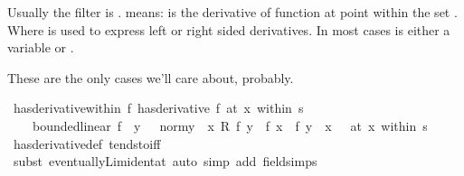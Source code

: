 \begin{isabellebody}
\begin{isamarkuptext}%
Usually the filter  is .   means:  is the derivative of function  at point 
  within the set . Where  is used to express left or right sided derivatives. In
  most cases  is either a variable or .%
\end{isamarkuptext}\isamarkuptrue%
%
\begin{isamarkuptext}%
These are the only cases we'll care about, probably.%
\end{isamarkuptext}\isamarkuptrue%
\isamarkupfalse%
\ has{\isacharunderscore}{\kern0pt}derivative{\isacharunderscore}{\kern0pt}within{\isacharcolon}{\kern0pt}\ {\isachardoublequoteopen}{\isacharparenleft}{\kern0pt}f\ has{\isacharunderscore}{\kern0pt}derivative\ f{\isacharprime}{\kern0pt}{\isacharparenright}{\kern0pt}\ {\isacharparenleft}{\kern0pt}at\ x\ within\ s{\isacharparenright}{\kern0pt}\ {\isasymlongleftrightarrow}\isanewline
\ \ \ \ bounded{\isacharunderscore}{\kern0pt}linear\ f{\isacharprime}{\kern0pt}\ {\isasymand}\ {\isacharparenleft}{\kern0pt}{\isacharparenleft}{\kern0pt}{\isasymlambda}y{\isachardot}{\kern0pt}\ {\isacharparenleft}{\kern0pt}{}\ {\isacharslash}{\kern0pt}\ norm{\isacharparenleft}{\kern0pt}y\ {\isacharminus}{\kern0pt}\ x{\isacharparenright}{\kern0pt}{\isacharparenright}{\kern0pt}\ {\isacharasterisk}{\kern0pt}\isactrlsub R\ {\isacharparenleft}{\kern0pt}f\ y\ {\isacharminus}{\kern0pt}\ {\isacharparenleft}{\kern0pt}f\ x\ {\isacharplus}{\kern0pt}\ f{\isacharprime}{\kern0pt}\ {\isacharparenleft}{\kern0pt}y\ {\isacharminus}{\kern0pt}\ x{\isacharparenright}{\kern0pt}{\isacharparenright}{\kern0pt}{\isacharparenright}{\kern0pt}{\isacharparenright}{\kern0pt}\ {\isasymlonglongrightarrow}\ {}{\isacharparenright}{\kern0pt}\ {\isacharparenleft}{\kern0pt}at\ x\ within\ s{\isacharparenright}{\kern0pt}{\isachardoublequoteclose}\isanewline
%
\isadelimproof
\ \ %
\endisadelimproof
%
\isatagproof
{}\isamarkupfalse%
\ has{\isacharunderscore}{\kern0pt}derivative{\isacharunderscore}{\kern0pt}def\ tendsto{\isacharunderscore}{\kern0pt}iff\isanewline
\ \ \isamarkupfalse%
\ {\isacharparenleft}{\kern0pt}subst\ eventually{\isacharunderscore}{\kern0pt}Lim{\isacharunderscore}{\kern0pt}ident{\isacharunderscore}{\kern0pt}at{\isacharparenright}{\kern0pt}\ {\isacharparenleft}{\kern0pt}auto\ simp\ add{\isacharcolon}{\kern0pt}\ field{\isacharunderscore}{\kern0pt}simps{\isacharparenright}{\kern0pt}%

\end{isabellebody}
